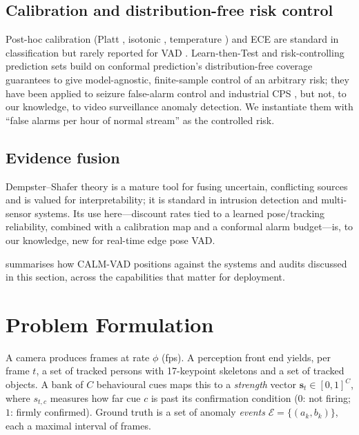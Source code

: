 \documentclass[conference]{IEEEtran}
\newcommand{\method}{CALM-VAD}
\begin{document}
\subsection{Calibration and distribution-free risk control}
Post-hoc calibration (Platt \cite{platt1999}, isotonic
\cite{zadrozny2002isotonic}, temperature \cite{guo2017calibration}) and ECE
\cite{naeini2015ece} are standard in classification but rarely reported for
VAD \cite{benchmarkauc2026}. Learn-then-Test \cite{angelopoulos2021ltt} and
risk-controlling prediction sets \cite{bates2021rcps} build on conformal
prediction's distribution-free coverage guarantees \cite{vovk2005algorithmic}
to give model-agnostic, finite-sample control of an arbitrary risk; they have
been applied to seizure
false-alarm control \cite{seizurercps2023} and industrial CPS
\cite{conformalcps2026}, but not, to our knowledge, to video surveillance
anomaly detection. We instantiate them with ``false alarms per hour of normal
stream'' as the controlled risk.

\subsection{Evidence fusion}
Dempster--Shafer theory \cite{shafer1976,smets1994tbm} is a mature tool for
fusing uncertain, conflicting sources and is valued for interpretability; it
is standard in intrusion detection \cite{dsids2005} and multi-sensor systems.
Its use here---discount rates tied to a learned pose/tracking reliability,
combined with a calibration map and a conformal alarm budget---is, to our
knowledge, new for real-time edge pose VAD.

 summarises how \method{} positions against the systems
and audits discussed in this section, across the capabilities that matter for
deployment.



\section{Problem Formulation}
\label{sec:problem}

A camera produces frames at rate $\phi$ (fps). A perception front end yields,
per frame $t$, a set of tracked persons with 17-keypoint skeletons and a set
of tracked objects. A bank of $C$ behavioural cues maps this to a
\emph{strength} vector $\mathbf{s}_t\in[0,1]^C$, where $s_{t,c}$ measures how
far cue $c$ is past its confirmation condition ($0$: not firing; $1$: firmly
confirmed). Ground truth is a set of anomaly \emph{events}
$\mathcal{E}=\{(a_k,b_k)\}$, each a maximal interval of frames.
\end{document}
